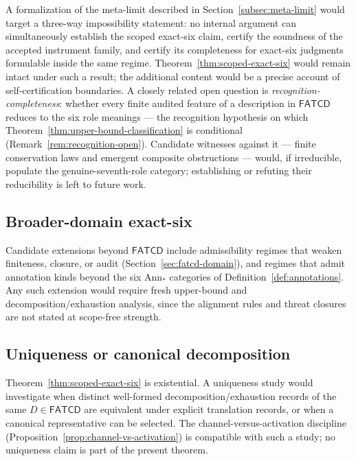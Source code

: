 \documentclass[11pt]{article}
\theoremstyle{definition}
\newcommand{\FATCD}{\ensuremath{\mathsf{FATCD}}}
\begin{document}
A formalization of the meta-limit described in
Section~\ref{subsec:meta-limit} would target a three-way
impossibility statement: no internal argument can simultaneously
establish the scoped exact-six claim, certify the soundness of the
accepted instrument family, and certify its completeness for
exact-six judgments formulable inside the same regime.
Theorem~\ref{thm:scoped-exact-six} would remain intact under such a
result; the additional content would be a precise account of
self-certification boundaries. A closely related open question is
\emph{recognition-completeness}: whether every finite audited feature of a
description in \FATCD{} reduces to the six role meanings --- the recognition
hypothesis on which Theorem~\ref{thm:upper-bound-classification} is conditional
(Remark~\ref{rem:recognition-open}). Candidate witnesses against it --- finite
conservation laws and emergent composite obstructions --- would, if irreducible,
populate the genuine-seventh-role category; establishing or refuting their
reducibility is left to future work.

\subsection{Broader-domain exact-six}\label{subsec:future-broader-domain}

Candidate extensions beyond \FATCD{} include admissibility regimes
that weaken finiteness, closure, or audit
(Section~\ref{sec:fatcd-domain}), and regimes that admit annotation
kinds beyond the six \(\mathrm{Ann}_*\) categories of
Definition~\ref{def:annotations}. Any such extension would require
fresh upper-bound and decomposition/exhaustion analysis, since the
alignment rules and threat closures are not stated at scope-free
strength.

\subsection{Uniqueness or canonical decomposition}\label{subsec:future-uniqueness}

Theorem~\ref{thm:scoped-exact-six} is existential. A uniqueness study
would investigate when distinct well-formed decomposition/exhaustion
records of the same \(D \in \FATCD{}\) are equivalent under explicit
translation records, or when a canonical representative can be
selected. The channel-versus-activation discipline
(Proposition~\ref{prop:channel-vs-activation}) is compatible with
such a study; no uniqueness claim is part of the present theorem.
\end{document}

